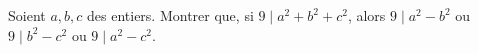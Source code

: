 Soient $a, b, c$ des entiers. Montrer que, si $9 \mid a^2 + b^2 + c^2$, alors $9 \mid a^2 - b^2$ ou $9 \mid b^2 - c^2$ ou $9 \mid a^2 - c^2$.
